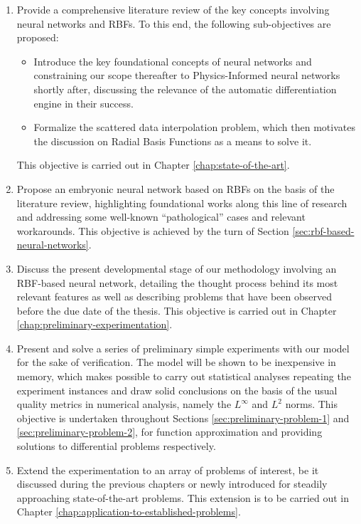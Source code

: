 \documentclass[12pt]{report} %
\begin{document}
\begin{enumerate}
  \item Provide a comprehensive literature review of the key concepts involving neural networks and RBFs. To this end, the following sub-objectives are proposed:
  \begin{itemize}
    \item Introduce the key foundational concepts of neural networks and constraining our scope thereafter to Physics-Informed neural networks shortly after, discussing the relevance of the automatic differentiation engine in their success.
    \item Formalize the scattered data interpolation problem, which then motivates the discussion on Radial Basis Functions as a means to solve it.
  \end{itemize}
  This objective is carried out in Chapter \ref{chap:state-of-the-art}.
  \item Propose an embryonic neural network based on RBFs on the basis of the literature review, highlighting foundational works along this line of research and addressing some well-known ``pathological'' cases and relevant workarounds. This objective is achieved by the turn of Section \ref{sec:rbf-based-neural-networks}.
  \item Discuss the present developmental stage of our methodology involving an RBF-based neural network, detailing the thought process behind its most relevant features as well as describing problems that have been observed before the due date of the thesis. This objective is carried out in Chapter \ref{chap:preliminary-experimentation}.
  \item Present and solve a series of preliminary simple experiments with our model for the sake of verification. The model will be shown to be inexpensive in memory, which makes possible to carry out statistical analyses repeating the experiment instances and draw solid conclusions on the basis of the usual quality metrics in numerical analysis, namely the $L^\infty$ and $L^2$ norms. This objective is undertaken throughout Sections \ref{sec:preliminary-problem-1} and \ref{sec:preliminary-problem-2}, for function approximation and providing solutions to differential problems respectively.
  \item Extend the experimentation to an array of problems of interest, be it discussed during the previous chapters or newly introduced for steadily approaching state-of-the-art problems. This extension is to be carried out in Chapter \ref{chap:application-to-established-problems}.
\end{enumerate}
\end{document}
